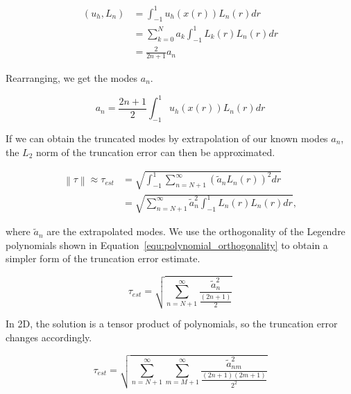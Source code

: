 \begin{equation} \label{equ:modes_inner_product}
    \begin{aligned}
        \left( u_h, L_n \right) & = \int_{-1}^{1} u_h(x(r)) L_n(r) dr                  \\
                                & = \sum_{k = 0}^{N} a_k \int_{-1}^{1} L_k(r) L_n(r)dr \\
                                & = \frac{2}{2n + 1} a_n
    \end{aligned}
\end{equation}

\noindent
Rearranging, we get the modes \(a_n\).

\begin{equation} \label{equ:modes}
    a_n = \frac{2n + 1}{2}\int_{-1}^{1}u_h(x(r))L_n(r)dr
\end{equation}

\noindent
If we can obtain the truncated modes by extrapolation of our known modes \(a_n\), the \(L_2\) norm
of the truncation error can then be approximated.

\begin{equation} \label{equ:error_norm}
    \begin{aligned}
        \left \| \tau \right \| \approx \tau_{est} & = \sqrt{\int_{-1}^{1} \sum_{n = N + 1}^{\infty } {\left( \widetilde{a}_n L_n(r) \right)}^2 dr} \\
                                                   & = \sqrt{\sum_{n = N + 1}^{\infty }\widetilde{a}_n^2 \int_{-1}^{1} L_n(r) L_n(r) dr},
    \end{aligned}
\end{equation}

\noindent
where \(\widetilde{a}_n\) are the extrapolated modes. We use the orthogonality of the Legendre
polynomials shown in Equation~\ref{equ:polynomial_orthogonality} to obtain a simpler form of the
truncation error estimate.

\begin{equation} \label{equ:error_norm_1D}
    \tau_{est} = \sqrt{\sum_{n = N + 1}^{\infty } \frac{\widetilde{a}_{n}^2}{\frac{(2n + 1)}{2}}}
\end{equation}

\noindent
In 2D, the solution is a tensor product of polynomials, so the truncation error changes accordingly.

\begin{equation} \label{equ:error_norm_2D}
    \tau_{est} = \sqrt{\sum_{n = N + 1}^{\infty } \sum_{m = M + 1}^{\infty}\frac{\widetilde{a}_{nm}^2}{\frac{(2n + 1)(2m + 1)}{2^2}}}
\end{equation}

